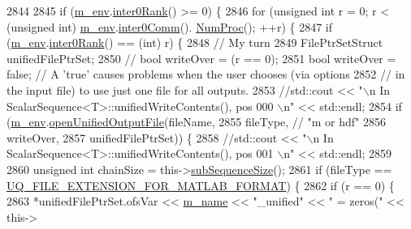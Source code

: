 \begin{DoxyCode}
2844 
2845   \textcolor{keywordflow}{if} (\hyperlink{class_q_u_e_s_o_1_1_scalar_sequence_a71618cd6351b29361b437af68447a4c8}{m\_env}.\hyperlink{class_q_u_e_s_o_1_1_base_environment_ae106b5bb8a80b655b88b3a26b1e7c185}{inter0Rank}() >= 0) \{
2846     \textcolor{keywordflow}{for} (\textcolor{keywordtype}{unsigned} \textcolor{keywordtype}{int} r = 0; r < (\textcolor{keywordtype}{unsigned} int) \hyperlink{class_q_u_e_s_o_1_1_scalar_sequence_a71618cd6351b29361b437af68447a4c8}{m\_env}.\hyperlink{class_q_u_e_s_o_1_1_base_environment_a689e4d140c74d495d97eb498714a4b82}{inter0Comm}().
      \hyperlink{class_q_u_e_s_o_1_1_mpi_comm_aa780721ae0fdeabc5a15e04cb0cad964}{NumProc}(); ++r) \{
2847       \textcolor{keywordflow}{if} (\hyperlink{class_q_u_e_s_o_1_1_scalar_sequence_a71618cd6351b29361b437af68447a4c8}{m\_env}.\hyperlink{class_q_u_e_s_o_1_1_base_environment_ae106b5bb8a80b655b88b3a26b1e7c185}{inter0Rank}() == (int) r) \{
2848         \textcolor{comment}{// My turn}
2849         FilePtrSetStruct unifiedFilePtrSet;
2850         \textcolor{comment}{// bool writeOver = (r == 0);}
2851         \textcolor{keywordtype}{bool} writeOver = \textcolor{keyword}{false}; \textcolor{comment}{// A 'true' causes problems when the user chooses (via options}
2852                                 \textcolor{comment}{// in the input file) to use just one file for all outputs.}
2853         \textcolor{comment}{//std::cout << "\(\backslash\)n In ScalarSequence<T>::unifiedWriteContents(), pos 000 \(\backslash\)n" << std::endl;}
2854         \textcolor{keywordflow}{if} (\hyperlink{class_q_u_e_s_o_1_1_scalar_sequence_a71618cd6351b29361b437af68447a4c8}{m\_env}.\hyperlink{class_q_u_e_s_o_1_1_base_environment_ad4dd93dbcb8d2f9ef79af9afaec00aa5}{openUnifiedOutputFile}(fileName,
2855                                         fileType, \textcolor{comment}{// "m or hdf"}
2856                                         writeOver,
2857                                         unifiedFilePtrSet)) \{
2858           \textcolor{comment}{//std::cout << "\(\backslash\)n In ScalarSequence<T>::unifiedWriteContents(), pos 001 \(\backslash\)n" << std::endl;}
2859 
2860           \textcolor{keywordtype}{unsigned} \textcolor{keywordtype}{int} chainSize = this->\hyperlink{class_q_u_e_s_o_1_1_scalar_sequence_a0288ea295eedc216a1617b3286f6f3a0}{subSequenceSize}();
2861           \textcolor{keywordflow}{if} (fileType == \hyperlink{_defines_8h_ac440026eff7deb1c1eed1eea0e8e36ba}{UQ\_FILE\_EXTENSION\_FOR\_MATLAB\_FORMAT}) \{
2862             \textcolor{keywordflow}{if} (r == 0) \{
2863               *unifiedFilePtrSet.ofsVar << \hyperlink{class_q_u_e_s_o_1_1_scalar_sequence_a8568f3ceb7cef2c4e3cf6dbf52d43cdf}{m\_name} << \textcolor{stringliteral}{"\_unified"} << \textcolor{stringliteral}{" = zeros("} << this->

\end{DoxyCode}
